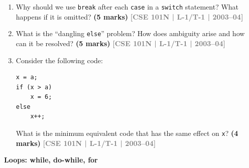 \documentclass[12pt,a3paper]{article}
\newcommand{\yr}[1]{\hfill\textcolor{gray}{\small\textbf{[#1]}}}
\newcommand{\mk}[1]{\textcolor{orange!70!black}{\small\textbf{(#1 marks)}}}
\newcommand{\subtopic}[2]{%
  \vspace{10pt}
  \noindent\begin{tcolorbox}[colback=#1!8,colframe=#1,boxrule=0.6pt,arc=4pt,
    left=6pt,right=6pt,top=4pt,bottom=4pt]
    \small\bfseries\textcolor{#1}{#2}
  \end{tcolorbox}
  \vspace{2pt}
}
\begin{document}
\begin{enumerate}
\item Why should we use \texttt{break} after each \texttt{case} in a \texttt{switch} statement? What happens if it is omitted?
\mk{5} \yr{CSE 101N | L-1/T-1 | 2003--04}

\item What is the ``dangling \texttt{else}'' problem? How does ambiguity arise and how can it be resolved?
\mk{5} \yr{CSE 101N | L-1/T-1 | 2003--04}

\item Consider the following code:
\begin{lstlisting}
x = a;
if (x > a)
    x = 6;
else
    x++;
\end{lstlisting}
What is the minimum equivalent code that has the same effect on \texttt{x}?
\mk{4} \yr{CSE 101N | L-1/T-1 | 2003--04}

\end{enumerate}

\subtopic{cA}{Loops: while, do-while, for}
\label{sub:s2-loops}
\end{document}
